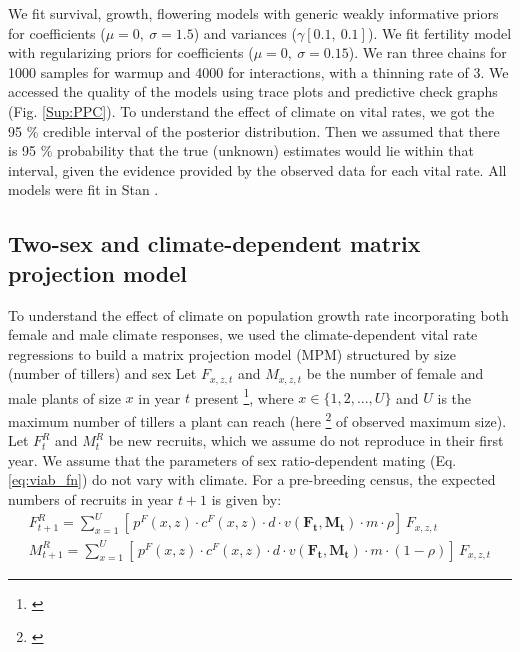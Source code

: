 \documentclass[12pt]{article}
\newcommand{\tom}[2]{{\color{red}{#1}}\footnote{\textit{\color{red}{#2}}}}
\begin{document}
We fit survival, growth, flowering models with generic weakly informative priors for coefficients ($\mu = 0,\ \sigma = 1.5$) and variances ($\gamma [0.1,\ 0.1]$).
We fit fertility model with regularizing priors for coefficients ($\mu = 0,\ \sigma = 0.15$).
We ran three chains for 1000 samples for warmup and 4000 for interactions, with a thinning rate of 3.
We accessed the quality of the models using trace plots and predictive check graphs \citep{piironen2017comparison} (Fig. \ref{Sup:PPC}).
To understand the effect of climate on vital rates, we got the 95 \% credible interval of the posterior distribution.  
Then we assumed that there is 95 \% probability that the true (unknown) estimates would lie within that interval, given the evidence provided by the observed data for each vital rate.
All models were fit in Stan \citep{rstan}. 

\subsection*{Two-sex and climate-dependent matrix projection model}
To understand the effect of climate on population growth rate incorporating both female and male climate responses, we used the climate-dependent vital rate regressions to build a matrix projection model (MPM) structured by size (number of tillers) and sex  
Let $F_{x,z,t}$ and $M_{x,z,t}$ be the number of female and male plants of size $x$ in year $t$ present \tom{at a location that has $z$ as climate}{The variable $z$ is not used consistently or correctly. Notice in eq:viabMPM and eq:dynamics you use $z$ in the RHS but not the LHS. CLimate is not a state variable.}, where $x \in \{1,2,...,U\}$ and $U$ is the maximum number of tillers a plant can reach (here \tom{95th percentile}{I remember you experimented with this. Is this the actual percentile you used or was this text from the Am Nat paper?} of observed maximum size).
Let $F^{R}_{t}$ and $M^{R}_{t}$ be new recruits, which we assume do not reproduce in their first year.
We assume that the parameters of sex ratio-dependent mating (Eq. \ref{eq:viab_fn}) do not vary with climate.  
For a pre-breeding census, the expected numbers of recruits in year $t+1$ is given by:
\begin{align}\label{eq:recruits}
F^{R}_{t+1} = \sum_{x=1}^{U} 	[ \, p^{F}(x,z) \cdot c^{F}(x,z) \cdot d \cdot v(\mathbf{F_{t}},\mathbf{M_{t}}) \cdot m \cdot \rho 	] \, F_{x,z,t}
\\
M^{R}_{t+1} = \sum_{x=1}^{U} 	[ \, p^{F}(x,z) \cdot c^{F}(x,z) \cdot d \cdot v(\mathbf{F_{t}},\mathbf{M_{t}}) \cdot m \cdot (1-\rho) 	] \, F_{x,z,t}
\end{align}
\end{document}
